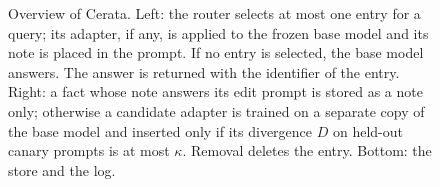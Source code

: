 \begin{figure}[t]
{}
\caption{Overview of Cerata. Left: the router selects at most one entry for a query; its
adapter, if any, is applied to the frozen base model and its note is placed in the
prompt. If no entry is selected, the base model answers. The answer is returned with the
identifier of the entry. Right: a fact whose note answers its edit prompt is stored as a
note only; otherwise a candidate adapter is trained on a separate copy of the base model
and inserted only if its divergence $D$ on held-out canary prompts is at most $\kappa$.
Removal deletes the entry. Bottom: the store and the log.}
\label{fig:arch}
\end{figure}

